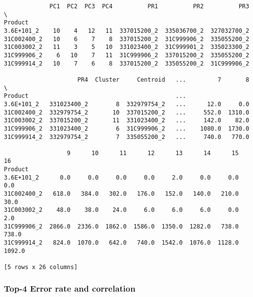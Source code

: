 \documentclass[11pt]{article}
\begin{document}
    
    \begin{verbatim}
             PC1  PC2  PC3  PC4          PR1          PR2          PR3  \
Product                                                                  
3.6E+101_2    10    4   12   11  337015200_2  335036700_2  327032700_2   
31C002400_2   10    6    7    8  337015200_2  31C999906_2  335055200_2   
31C003002_2   11    3    5   10  331023400_2  31C999901_2  335023300_2   
31C999906_2    6   10    7   11  31C999906_2  337015200_2  335055200_2   
31C999914_2   10    7    6    8  337015200_2  335055200_2  31C999906_2   

                     PR4  Cluster     Centroid   ...         7       8  \
Product                                          ...                     
3.6E+101_2   331023400_2        8  332979754_2   ...      12.0     0.0   
31C002400_2  332979754_2       10  337015200_2   ...     552.0  1310.0   
31C003002_2  337015200_2       11  331023400_2   ...     142.0    82.0   
31C999906_2  331023400_2        6  31C999906_2   ...    1080.0  1730.0   
31C999914_2  332979754_2        7  335055200_2   ...     740.0   770.0   

                  9      10      11      12      13      14      15      16  
Product                                                                      
3.6E+101_2      0.0     0.0     0.0     0.0     2.0     0.0     0.0     0.0  
31C002400_2   618.0   384.0   302.0   176.0   152.0   140.0   210.0    30.0  
31C003002_2    48.0    38.0    24.0     6.0     6.0     6.0     0.0     2.0  
31C999906_2  2866.0  2336.0  1862.0  1586.0  1350.0  1282.0   738.0   738.0  
31C999914_2   824.0  1070.0   642.0   740.0  1542.0  1076.0  1128.0  1092.0  

[5 rows x 26 columns]
    \end{verbatim}

    
    \subsubsection{Top-4 Error rate and
correlation}\label{top-4-error-rate-and-correlation}
\end{document}
